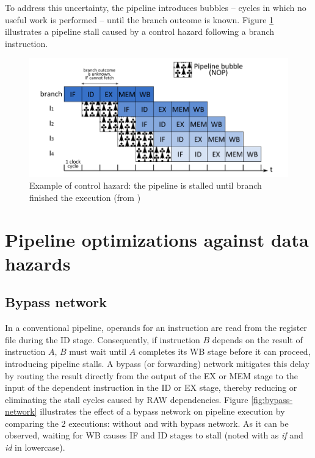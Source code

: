 To address this uncertainty, the pipeline introduces bubbles -- cycles in which no useful work is performed -- until the branch outcome is known. Figure \ref{fig:bubbles} illustrates a pipeline stall caused by a control hazard following a branch instruction.

\begin{figure}[H]
    \includegraphics[width=\textwidth]{figures/pipeline-bubbles.png}
    \caption{Example of control hazard: the pipeline is stalled until branch finished the execution (from \cite{perais_increasing_2016})}
    \label{fig:bubbles}
\end{figure}

\section{Pipeline optimizations against data hazards}

\subsection{Bypass network}

In a conventional pipeline, operands for an instruction are read from the register file during the ID stage. Consequently, if instruction $B$ depends on the result of instruction $A$, $B$ must wait until $A$ completes its WB stage before it can proceed, introducing pipeline stalls. A bypass (or forwarding) network mitigates this delay by routing the result directly from the output of the EX or MEM stage to the input of the dependent instruction in the ID or EX stage, thereby reducing or eliminating the stall cycles caused by RAW dependencies. Figure \ref{fig:bypass-network} illustrates the effect of a bypass network on pipeline execution by comparing the 2 executions: without and with bypass network. As it can be observed, waiting for WB causes IF and ID stages to stall (noted with as \textit{if} and \textit{id} in lowercase).

